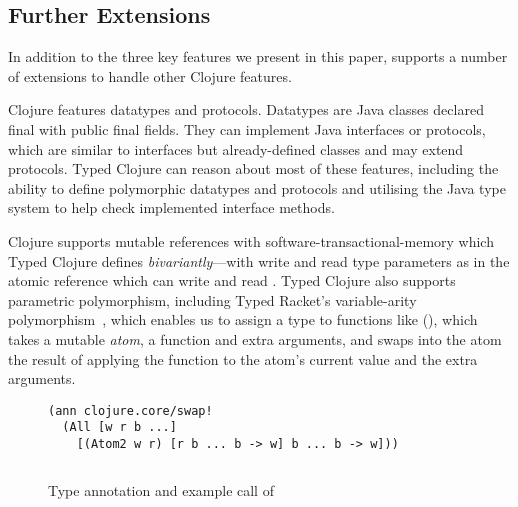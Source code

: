 \subsection{Further Extensions}

In addition to the three key features we present in this paper,
\coretyped{} supports a number of extensions to handle other Clojure
features. 

Clojure features datatypes and protocols. Datatypes are Java classes
declared final with public final fields. They can implement Java interfaces
or protocols, which are similar to interfaces but already-defined classes
and \nil{} may extend protocols.
%
Typed Clojure can reason about most of these features,
including the ability to define polymorphic datatypes and protocols and
utilising the Java type system to help check implemented interface methods.

%
%
Clojure supports mutable references with software-transactional-memory
which Typed Clojure defines \emph{bivariantly}---with write and read type parameters
as in the atomic reference  which can write and read .
Typed Clojure also supports parametric polymorphism, including
Typed Racket's variable-arity polymorphism~\cite{stf-esop}, 
which enables us to assign a type to functions like  (),
which takes a mutable \emph{atom},
a function and extra arguments, and swaps into the atom the result of
applying the function to the atom's current value and the extra arguments.

\begin{figure}
\begin{verbatim}
(ann clojure.core/swap! 
  (All [w r b ...] 
    [(Atom2 w r) [r b ... b -> w] b ... b -> w]))

\end{verbatim}
\inputminted[firstline=5,lastline=5]{clojure}{code/demo/src/demo/atom.clj}
\caption{Type annotation and example call of }
\label{main:fig:swap!}
\end{figure}


